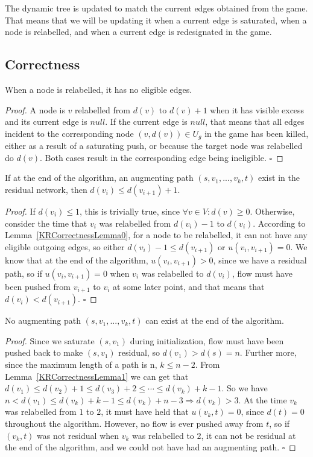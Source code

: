 The dynamic tree is updated to match the current edges obtained from the game. 
That means that we will be updating it when a current edge is saturated, when a node is relabelled, and when a current edge is redesignated in the game.



\subsection{Correctness}

\begin{lemma}
\label{KRCorrectnessLemma0}
When a node is relabelled, it has no eligible edges.
\end{lemma}
\begin{proof}
A node is $v$ relabelled from $d(v)$ to $d(v)+1$ when it has visible excess and its current edge is $null$.
If the current edge is $null$, that means that all edges incident to the corresponding node $(v, d(v))\in U_g$ in the game has been killed, either as a result of a saturating push, or because the target node was relabelled do $d(v)$.
Both cases result in the corresponding edge being ineligible. 
$\square$
\end{proof}
\begin{lemma}
\label{KRCorrectnessLemma1}
If at the end of the algorithm, an augmenting path $(s, v_1, ... ,v_k, t)$ exist in the residual network, then $d(v_i) \leq d(v_{i+1}) + 1$.
\end{lemma}
\begin{proof}
If $d(v_i) \leq 1$, this is trivially true, since $\forall v \in V: d(v) \geq 0$.
Otherwise, consider the time that $v_i$ was relabelled from $d(v_i)-1$ to $d(v_i)$.
According to Lemma~\ref{KRCorrectnessLemma0}, for a node to be relabelled, it can not have any eligible outgoing edges, so either $d(v_i) - 1 \leq d(v_{i+1})$ or $u(v_i, v_{i+1}) = 0$.
We know that at the end of the algorithm, $u(v_i, v_{i+1}) > 0$, since we have a residual path, so if $u(v_i, v_{i+1}) = 0$ when $v_i$ was relabelled to $d(v_i)$, 
flow must have been pushed from $v_{i+1}$ to $v_i$ at some later point, and that means that $d(v_i) < d(v_{i+1})$.
$\square$
\end{proof}
\begin{theorem}
No augmenting path $(s, v_1, ... ,v_k, t)$ can exist at the end of the algorithm.
\end{theorem}
\begin{proof}
Since we saturate $(s, v_1)$ during initialization, flow must have been pushed back to make $(s, v_1)$ residual, so $d(v_1)>d(s)=n$. Further more, since the maximum length of a path is n, $k \leq n-2$.
From Lemma~\ref{KRCorrectnessLemma1} we can get that $d(v_1) \leq d(v_2) + 1 \leq d(v_3) + 2 \leq \cdots \leq d(v_k) + k - 1$.
So we have $n<d(v_1) \leq d(v_k) + k - 1 \leq d(v_k) + n-3 \Rightarrow d(v_k)>3$.
At the time $v_k$ was relabelled from $1$ to $2$, it must have held that $u(v_k, t)=0$, since $d(t)=0$ throughout the algorithm.
However, no flow is ever pushed away from $t$, so if $(v_k, t)$ was not residual when $v_k$ was relabelled to $2$, it can not be residual at the end of the algorithm, and we could not have had an augmenting path.
$\square$
\end{proof}
